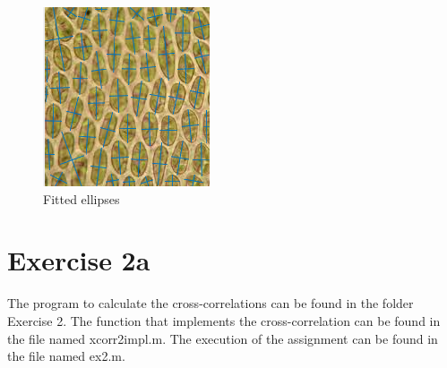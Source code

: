 \documentclass[12pt, a4paper]{article}
\begin{document}
	\begin{figure}[bp!]
		\caption{Fitted ellipses}
		\centering
		\includegraphics[width=\textwidth]{pictures/1b_fitted_ellipses}
	\end{figure}
	\newpage
	\part*{Exercise 2a}
	The program to calculate the cross-correlations can be found in the folder Exercise 2. The function that implements the cross-correlation can be found in the file named xcorr2impl.m. The execution of the assignment can be found in the file named ex2.m.
\end{document}
